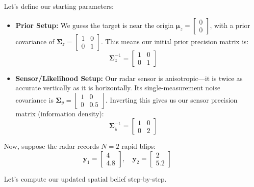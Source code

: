 \documentclass{article}
\begin{document}
Let's define our starting parameters:
\begin{itemize}
    \item \textbf{Prior Setup:} We guess the target is near the origin $\boldsymbol{\mu}_z = \begin{bmatrix} 0 \\ 0 \end{bmatrix}$, with a prior covariance of $\boldsymbol{\Sigma}_z = \begin{bmatrix} 1 & 0 \\ 0 & 1 \end{bmatrix}$. This means our initial prior precision matrix is:
    \begin{equation*}
    \boldsymbol{\Sigma}_z^{-1} = \begin{bmatrix} 1 & 0 \\ 0 & 1 \end{bmatrix}
    \end{equation*}
    \item \textbf{Sensor/Likelihood Setup:} Our radar sensor is anisotropic—it is twice as accurate vertically as it is horizontally. Its single-measurement noise covariance is $\boldsymbol{\Sigma}_y = \begin{bmatrix} 1 & 0 \\ 0 & 0.5 \end{bmatrix}$. Inverting this gives us our sensor precision matrix (information density):
    \begin{equation*}
    \boldsymbol{\Sigma}_y^{-1} = \begin{bmatrix} 1 & 0 \\ 0 & 2 \end{bmatrix}
    \end{equation*}
\end{itemize}

Now, suppose the radar records $N = 2$ rapid blips:
\begin{equation*}
\mathbf{y}_1 = \begin{bmatrix} 4 \\ 4.8 \end{bmatrix}, \quad \mathbf{y}_2 = \begin{bmatrix} 2 \\ 5.2 \end{bmatrix}
\end{equation*}

Let's compute our updated spatial belief step-by-step.
\end{document}
